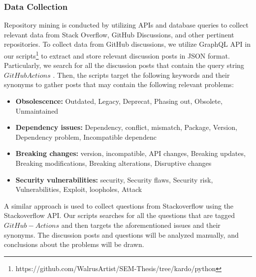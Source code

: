 \documentclass[conference]{IEEEtran}
\begin{document}
            \subsubsection{\textbf{Data Collection}}
                Repository mining is conducted by utilizing APIs and database queries to collect relevant data from Stack Overflow, GitHub Discussions, and other pertinent repositories. To collect data from GitHub discussions, we utilize GraphQL API  in our scripts\footnote{https://github.com/WalrusArtist/SEM-Thesis/tree/kardo/python} to extract and store relevant discussion posts in JSON format. Particularly, we search for all the discussion posts that contain the query string $GitHub Actions$ . Then, the scripts target the following keywords and their synonyms to gather posts that may contain the following relevant problems: \\

              \begin{itemize}
                \item \textbf{Obsolescence:} Outdated, Legacy, Deprecat, Phasing out, Obsolete, Unmaintained
                \item \textbf{Dependency issues:} Dependency, conflict, mismatch, Package, Version, Dependency problem, Incompatible dependenc
                \item	\textbf{Breaking changes:} version, incompatible, API changes, Breaking updates, Breaking modifications, Breaking alterations, Disruptive changes
                        \item \textbf{Security vulnerabilities:} security, Security flaws, Security risk, Vulnerabilities, Exploit, loopholes, Attack\\
              \end{itemize}
                A similar approach is used to collect questions from Stackoverflow using the Stackoverflow API. Our scripts searches for all the questions that are tagged $GitHub-Actions$ and then targets the aforementioned issues and their synonyms. The discussion posts and questions will be analyzed manually, and conclusions about the problems will be drawn.\\
\end{document}
